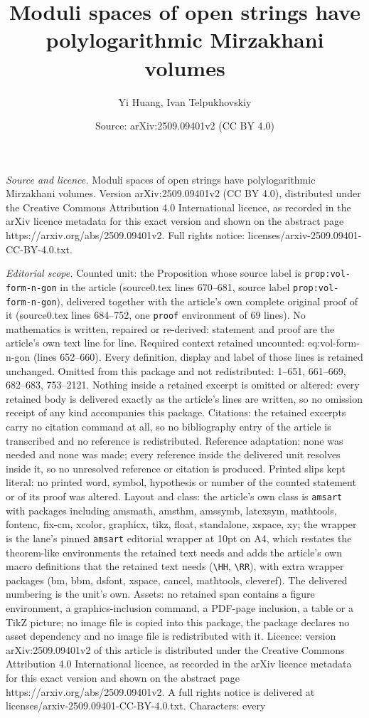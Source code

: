 \documentclass[10pt,a4paper]{amsart}
\title[Moduli spaces of open strings have polylogarithmic Mirzakhan]{Moduli spaces of open strings have polylogarithmic Mirzakhani volumes}
\author{Yi Huang, Ivan Telpukhovskiy}
\date{Source: arXiv:2509.09401v2 (CC BY 4.0)}
\begin{document}
\maketitle

\noindent\emph{Source and licence.} Moduli spaces of open strings have polylogarithmic Mirzakhani volumes. Version arXiv:2509.09401v2 (CC BY 4.0), distributed under the Creative Commons Attribution 4.0 International licence, as recorded in the arXiv licence metadata for this exact version and shown on the abstract page https://arxiv.org/abs/2509.09401v2. Full rights notice: licenses/arxiv-2509.09401-CC-BY-4.0.txt.\par\smallskip

\noindent\textit{Editorial scope.} Counted unit: the Proposition whose source label is \texttt{prop:vol-form-n-gon} in the article (source0.tex lines 670--681, source label \texttt{prop:vol-form-n-gon}), delivered together with the article's own complete original proof of it (source0.tex lines 684--752, one \texttt{proof} environment of 69 lines). No mathematics is written, repaired or re-derived: statement and proof are the article's own text line for line. Required context retained uncounted: eq:vol-form-n-gon (lines 652--660). Every definition, display and label of those lines is retained unchanged. Omitted from this package and not redistributed: 1--651, 661--669, 682--683, 753--2121. Nothing inside a retained excerpt is omitted or altered: every retained body is delivered exactly as the article's lines are written, so no omission receipt of any kind accompanies this package. Citations: the retained excerpts carry no citation command at all, so no bibliography entry of the article is transcribed and no reference is redistributed. Reference adaptation: none was needed and none was made; every reference inside the delivered unit resolves inside it, so no unresolved reference or citation is produced. Printed slips kept literal: no printed word, symbol, hypothesis or number of the counted statement or of its proof was altered. Layout and class: the article's own class is \texttt{amsart} with packages including amsmath, amsthm, amssymb, latexsym, mathtools, fontenc, fix-cm, xcolor, graphicx, tikz, float, standalone, xspace, xy; the wrapper is the lane's pinned \texttt{amsart} editorial wrapper at 10pt on A4, which restates the theorem-like environments the retained text needs and adds the article's own macro definitions that the retained text needs (\texttt{\textbackslash HH}, \texttt{\textbackslash RR}), with extra wrapper packages (bm, bbm, dsfont, xspace, cancel, mathtools, cleveref). The delivered numbering is the unit's own. Assets: no retained span contains a figure environment, a graphics-inclusion command, a PDF-page inclusion, a table or a TikZ picture; no image file is copied into this package, the package declares no asset dependency and no image file is redistributed with it. Licence: version arXiv:2509.09401v2 of this article is distributed under the Creative Commons Attribution 4.0 International licence, as recorded in the arXiv licence metadata for this exact version and shown on the abstract page https://arxiv.org/abs/2509.09401v2. A full rights notice is delivered at licenses/arxiv-2509.09401-CC-BY-4.0.txt. Characters: every 
\end{document}
